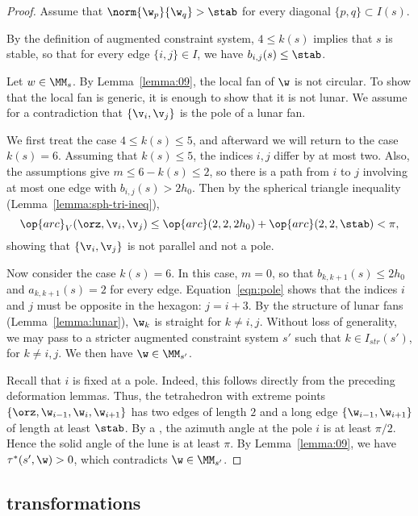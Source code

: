 \begin{proof}
Assume that $\norm{\w_p}{\w_q}> \stab$ for every diagonal $\{p,q\}\subset I(s)$.

By the definition of augmented constraint system, $4\le k(s)$ implies
that $s$ is stable, so that for every edge $\{i,j\}\in I$, we have
$b_{i,j}(s) \le\stab$.

Let $w\in \MM_s$.  By Lemma~\ref{lemma:09}, the local fan of $\w$  is not circular.
To show that the local fan is generic, it is enough to show that it is not lunar.
We assume for a contradiction that $\{\v_i,\v_j\}$ is the pole of a lunar fan.

We first treat the case  $4\le k(s)\le 5$,
and afterward we will return to the case $k(s)=6$. 
Assuming that  $k(s)\le 5$, the indices $i,j$ differ by at most two.
Also, the assumptions give $m\le 6-k(s)\le 2$, so there is a path from
$i$ to $j$ involving at most one edge with $b_{i,j}(s)>2h_0$.
Then by the spherical triangle inequality (Lemma~\ref{lemma:sph-tri-ineq}),
\begin{equation}\label{eqn:pole}
\op{arc}_V(\orz,\v_i,\v_j) \le \op{arc}(2,2,2h_0) + \op{arc}(2,2,\stab) < \pi,
\end{equation}
showing that $\{\v_i,\v_j\}$ is not parallel and not a pole.

Now consider the case $k(s)=6$.  In this case, $m=0$, so that $b_{k,k+1}(s)\le 2h_0$
and $a_{k,k+1}(s)=2$
for every edge. Equation~\ref{eqn:pole} shows that the indices $i$ and $j$
must be opposite in the hexagon: $j = i+3$.  By the structure of lunar fans
(Lemma~\ref{lemma:lunar}), $\w_k$ is straight for $k\ne i,j$.  Without
loss of generality, we may
pass to a stricter augmented constraint system $s'$ such that
$k\in I_{str}(s')$, for $k\ne i,j$.  We then have $\w\in \MM_{s'}$.

Recall that $i$ is fixed at a pole. 
  Indeed, this follows directly from the preceding deformation
lemmas.  Thus, the tetrahedron with extreme points
$\{\orz,\w_{i-1},\w_i,\w_{i+1}\}$ has two edges
of length $2$ and a long edge $\{\w_{i-1},\w_{i+1}\}$ of length at least
$\stab$.  By a , 
the azimuth angle at the pole $i$ is at least $\pi/2$.
Hence the solid angle of the lune is at least $\pi$.  By Lemma~\ref{lemma:09},
we have $\tau^*(s',\w)>0$, which contradicts $\w\in \MM_{s'}$.
\end{proof}


\subsection{transformations}



